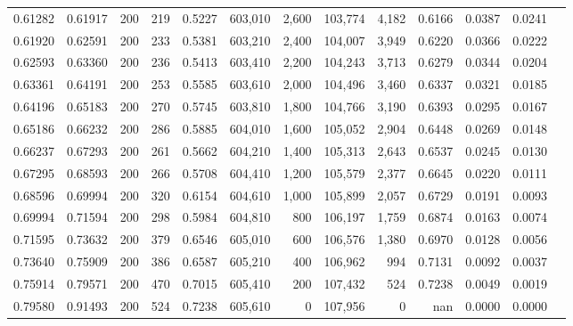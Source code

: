 \begin{tabular}{rrrrrrrrrrrrr}
0.61282 & 0.61917 &    200 & 219 &                                     0.5227 & 603,010 &   2,600 & 103,774 &   4,182 & 0.6166 & 0.0387 & 0.0241 \\
0.61920 & 0.62591 &    200 & 233 &                                     0.5381 & 603,210 &   2,400 & 104,007 &   3,949 & 0.6220 & 0.0366 & 0.0222 \\
0.62593 & 0.63360 &    200 & 236 &                                     0.5413 & 603,410 &   2,200 & 104,243 &   3,713 & 0.6279 & 0.0344 & 0.0204 \\
0.63361 & 0.64191 &    200 & 253 &                                     0.5585 & 603,610 &   2,000 & 104,496 &   3,460 & 0.6337 & 0.0321 & 0.0185 \\
0.64196 & 0.65183 &    200 & 270 &                                     0.5745 & 603,810 &   1,800 & 104,766 &   3,190 & 0.6393 & 0.0295 & 0.0167 \\
0.65186 & 0.66232 &    200 & 286 &                                     0.5885 & 604,010 &   1,600 & 105,052 &   2,904 & 0.6448 & 0.0269 & 0.0148 \\
0.66237 & 0.67293 &    200 & 261 &                                     0.5662 & 604,210 &   1,400 & 105,313 &   2,643 & 0.6537 & 0.0245 & 0.0130 \\
0.67295 & 0.68593 &    200 & 266 &                                     0.5708 & 604,410 &   1,200 & 105,579 &   2,377 & 0.6645 & 0.0220 & 0.0111 \\
0.68596 & 0.69994 &    200 & 320 &                                     0.6154 & 604,610 &   1,000 & 105,899 &   2,057 & 0.6729 & 0.0191 & 0.0093 \\
0.69994 & 0.71594 &    200 & 298 &                                     0.5984 & 604,810 &     800 & 106,197 &   1,759 & 0.6874 & 0.0163 & 0.0074 \\
0.71595 & 0.73632 &    200 & 379 &                                     0.6546 & 605,010 &     600 & 106,576 &   1,380 & 0.6970 & 0.0128 & 0.0056 \\
0.73640 & 0.75909 &    200 & 386 &                                     0.6587 & 605,210 &     400 & 106,962 &     994 & 0.7131 & 0.0092 & 0.0037 \\
0.75914 & 0.79571 &    200 & 470 &                                     0.7015 & 605,410 &     200 & 107,432 &     524 & 0.7238 & 0.0049 & 0.0019 \\
0.79580 & 0.91493 &    200 & 524 &                                     0.7238 & 605,610 &       0 & 107,956 &       0 &    nan & 0.0000 & 0.0000 \\
\bottomrule
\end{tabular}
